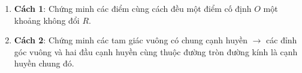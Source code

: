 \begin{enumerate}
\item \textbf{Cách 1}: Chứng minh các điểm cùng cách đều một điểm cố định $O$ một khoảng không đổi $R$.
\item \textbf{Cách 2}: Chứng minh các tam giác vuông có chung cạnh huyền $\rightarrow$ các đỉnh góc vuông và hai đầu cạnh huyền cùng thuộc đường tròn đường kính là cạnh huyền chung đó.
\end{enumerate}
